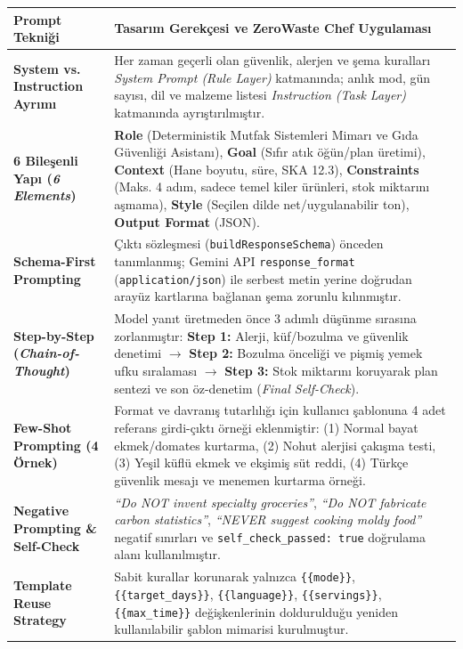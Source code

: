 \documentclass[9pt,a4paper]{article}
\begin{document}
\vspace{1pt}
{\scriptsize
\renewcommand{\arraystretch}{1.12}
\begin{tabularx}{\textwidth}{>{\bfseries\color{undpdark}}p{3.1cm} X}
\toprule
\textbf{Prompt Tekniği} & \textbf{Tasarım Gerekçesi ve ZeroWaste Chef Uygulaması} \\
\midrule
System vs. Instruction Ayrımı & Her zaman geçerli olan güvenlik, alerjen ve şema kuralları \emph{System Prompt (Rule Layer)} katmanında; anlık mod, gün sayısı, dil ve malzeme listesi \emph{Instruction (Task Layer)} katmanında ayrıştırılmıştır. \\
6 Bileşenli Yapı (\emph{6 Elements}) & \textbf{Role} (Deterministik Mutfak Sistemleri Mimarı ve Gıda Güvenliği Asistanı), \textbf{Goal} (Sıfır atık öğün/plan üretimi), \textbf{Context} (Hane boyutu, süre, SKA 12.3), \textbf{Constraints} (Maks. 4 adım, sadece temel kiler ürünleri, stok miktarını aşmama), \textbf{Style} (Seçilen dilde net/uygulanabilir ton), \textbf{Output Format} (JSON). \\
Schema-First Prompting & Çıktı sözleşmesi (\texttt{buildResponseSchema}) önceden tanımlanmış; Gemini API \texttt{response\_format} (\texttt{application/json}) ile serbest metin yerine doğrudan arayüz kartlarına bağlanan şema zorunlu kılınmıştır. \\
Step-by-Step (\emph{Chain-of-Thought}) & Model yanıt üretmeden önce 3 adımlı düşünme sırasına zorlanmıştır: \textbf{Step 1:} Alerji, küf/bozulma ve güvenlik denetimi $\rightarrow$ \textbf{Step 2:} Bozulma önceliği ve pişmiş yemek ufku sıralaması $\rightarrow$ \textbf{Step 3:} Stok miktarını koruyarak plan sentezi ve son öz-denetim (\emph{Final Self-Check}). \\
Few-Shot Prompting (4 Örnek) & Format ve davranış tutarlılığı için kullanıcı şablonuna 4 adet referans girdi-çıktı örneği eklenmiştir: (1) Normal bayat ekmek/domates kurtarma, (2) Nohut alerjisi çakışma testi, (3) Yeşil küflü ekmek ve ekşimiş süt reddi, (4) Türkçe güvenlik mesajı ve menemen kurtarma örneği. \\
Negative Prompting \& Self-Check & \emph{``Do NOT invent specialty groceries''}, \emph{``Do NOT fabricate carbon statistics''}, \emph{``NEVER suggest cooking moldy food''} negatif sınırları ve \texttt{self\_check\_passed: true} doğrulama alanı kullanılmıştır. \\
Template Reuse Strategy & Sabit kurallar korunarak yalnızca \texttt{\{\{mode\}\}}, \texttt{\{\{target\_days\}\}}, \texttt{\{\{language\}\}}, \texttt{\{\{servings\}\}}, \texttt{\{\{max\_time\}\}} değişkenlerinin doldurulduğu yeniden kullanılabilir şablon mimarisi kurulmuştur. \\
\bottomrule
\end{tabularx}
}
\end{document}
